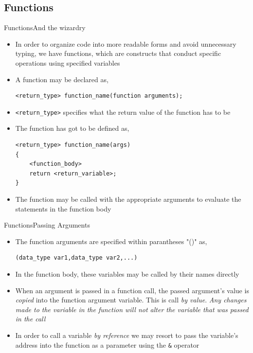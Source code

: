 \documentclass{beamer}
\begin{document}
\subsection{Functions}
\begin{frame}[fragile]{Functions}{And the wizardry}
\begin{itemize}
\item In order to organize code into more readable forms and avoid unnecessary typing, we have functions, which are constructs that conduct specific operations using specified variables
\item A function may be declared as,
\begin{verbatim}
<return_type> function_name(function arguments);
\end{verbatim}
\item \verb|<return_type>| specifies what the return value of the function has to be 
\item The function has got to be defined as,
\begin{verbatim}
<return_type> function_name(args)
{
    <function_body>
    return <return_variable>;
}
\end{verbatim}
\item The function may be called with the appropriate arguments to evaluate the statements in the function body
\end{itemize}
\end{frame}

\begin{frame}[fragile]{Functions}{Passing Arguments}
\begin{itemize}
\item The function arguments are specified within parantheses "()" as,
\begin{verbatim}
(data_type var1,data_type var2,...)
\end{verbatim}
\item In the function body, these variables may be called by their names directly
\item When an argument is passed in a function call, the passed argument's value is \emph{copied} into the function argument variable. This is call \emph{by value}. \emph{Any changes made to the variable in the function will not alter the variable that was passed in the call}
\item In order to call a variable \emph{by reference} we may resort to pass the variable's address into the function as a parameter using the \verb|&| operator
\end{itemize}
\end{frame}
\end{document}
